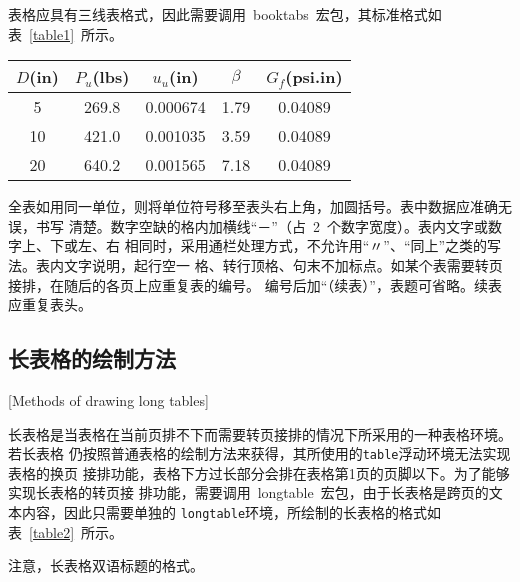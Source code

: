 表格应具有三线表格式，因此需要调用~booktabs~宏包，其标准格式如表~\ref{table1}~所示。
\begin{table}[htbp]
\vspace{0.5em}\centering\wuhao
\begin{tabular}{ccccc}
\toprule[1.5pt]
$D$(in) & $P_u$(lbs) & $u_u$(in) & $\beta$ & $G_f$(psi.in)\\
\midrule[1pt]
 5 & 269.8 & 0.000674 & 1.79 & 0.04089\\
10 & 421.0 & 0.001035 & 3.59 & 0.04089\\
20 & 640.2 & 0.001565 & 7.18 & 0.04089\\
\bottomrule[1.5pt]
\end{tabular}
\end{table}
全表如用同一单位，则将单位符号移至表头右上角，加圆括号。表中数据应准确无误，书写
清楚。数字空缺的格内加横线“－”（占~2~个数字宽度）。表内文字或数字上、下或左、右
相同时，采用通栏处理方式，不允许用“〃”、“同上”之类的写法。表内文字说明，起行空一
格、转行顶格、句末不加标点。如某个表需要转页接排，在随后的各页上应重复表的编号。
编号后加“（续表）”，表题可省略。续表应重复表头。

\subsection{长表格的绘制方法}[Methods of drawing long tables]

长表格是当表格在当前页排不下而需要转页接排的情况下所采用的一种表格环境。若长表格
仍按照普通表格的绘制方法来获得，其所使用的\verb|table|浮动环境无法实现表格的换页
接排功能，表格下方过长部分会排在表格第1页的页脚以下。为了能够实现长表格的转页接
排功能，需要调用~longtable~宏包，由于长表格是跨页的文本内容，因此只需要单独的
\verb|longtable|环境，所绘制的长表格的格式如表~\ref{table2}~所示。

注意，长表格双语标题的格式。

